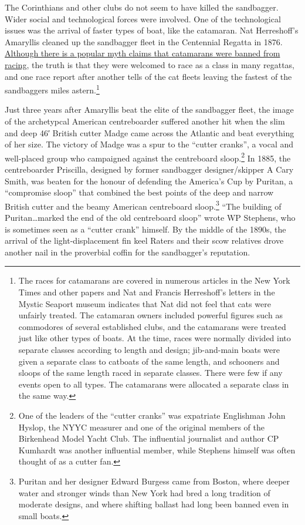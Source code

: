 \documentclass[
  letterpaper,
]{scrbook}
\begin{document}
The Corinthians and other clubs do not seem to have killed the
sandbagger. Wider social and technological forces were involved. One of
the technological issues was the arrival of faster types of boat, like
the catamaran. Nat Herreshoff's Amaryllis cleaned up the sandbagger
fleet in the Centennial Regatta in 1876.
\href{https://cthom249.wordpress.com/2016/05/16/the-real-story-of-amaryllis-and-the-first-racing-catamarans/}{Although
there is a popular myth claims that catamarans were banned from racing},
the truth is that they were welcomed to race as a class in many
regattas, and one race report after another tells of the cat fleets
leaving the fastest of the sandbaggers miles astern.\footnote{The races
  for catamarans are covered in numerous articles in the New York Times
  and other papers and Nat and Francis Herreshoff's letters in the
  Mystic Seaport museum indicates that Nat did not feel that cats were
  unfairly treated. The catamaran owners included powerful figures such
  as commodores of several established clubs, and the catamarans were
  treated just like other types of boats. At the time, races were
  normally divided into separate classes according to length and design;
  jib-and-main boats were given a separate class to catboats of the same
  length, and schooners and sloops of the same length raced in separate
  classes. There were few if any events open to all types. The
  catamarans were allocated a separate class in the same way.}

Just three years after Amaryllis beat the elite of the sandbagger fleet,
the image of the archetypcal American centreboarder suffered another hit
when the slim and deep 46′ British cutter Madge came across the Atlantic
and beat everything of her size. The victory of Madge was a spur to the
``cutter cranks'', a vocal and well-placed group who campaigned against
the centreboard sloop.\footnote{One of the leaders of the ``cutter
  cranks'' was expatriate Englishman John Hyslop, the NYYC measurer and
  one of the original members of the Birkenhead Model Yacht Club. The
  influential journalist and author CP Kumhardt was another influential
  member, while Stephens himself was often thought of as a cutter fan.}
In 1885, the centreboarder Priscilla, designed by former sandbagger
designer/skipper A Cary Smith, was beaten for the honour of defending
the America's Cup by Puritan, a ``compromise sloop'' that combined the
best points of the deep and narrow British cutter and the beamy American
centreboard sloop.\footnote{Puritan and her designer Edward Burgess came
  from Boston, where deeper water and stronger winds than New York had
  bred a long tradition of moderate designs, and where shifting ballast
  had long been banned even in small boats.} ``The building of
Puritan\ldots marked the end of the old centreboard sloop'' wrote WP
Stephens, who is sometimes seen as a ``cutter crank'' himself. By the
middle of the 1890s, the arrival of the light-displacement fin keel
Raters and their scow relatives drove another nail in the proverbial
coffin for the sandbagger's reputation.
\end{document}
